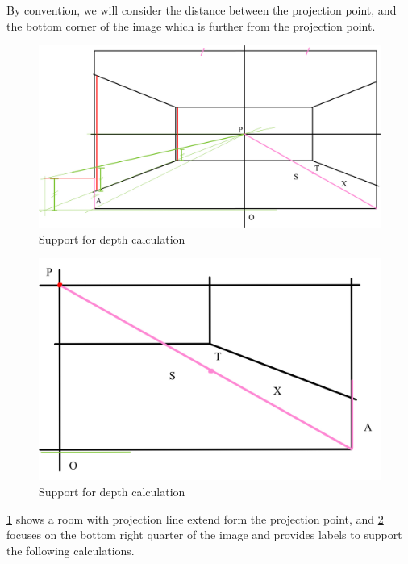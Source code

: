 By convention, we will consider the distance between the projection point, and the bottom corner of the image which is further from the projection point.\newline

\begin{figure}[H]
    \centering
    \includegraphics[width=1.0\textwidth]{Calculations7.jpeg}
    \caption{Support for depth calculation}
    \label{fig: Support for depth calculation}
\end{figure}

\begin{figure}[H]
    \centering
    \includegraphics[width=1.0\textwidth]{Calculations8.jpeg}
    \caption{Support for depth calculation}
    \label{fig: Support for depth calculation labels}
\end{figure}

\ref{fig: Support for depth calculation} shows a room with projection line extend form the projection point, and \ref{fig: Support for depth calculation labels} focuses on the bottom right quarter of the image and provides labels to support the following calculations.\newline

